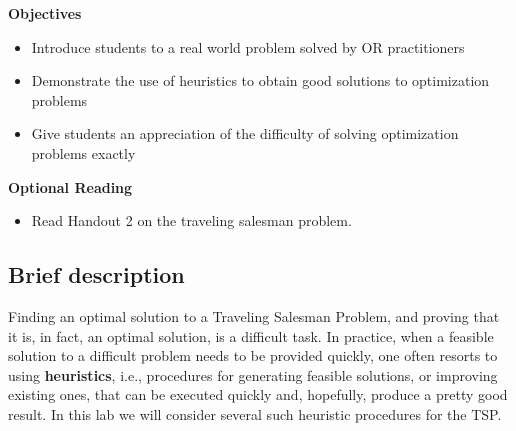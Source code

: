 \documentclass[twoside]{article}%
\begin{document}

\textbf{Objectives}
\begin{itemize}
\item   Introduce students to a real world problem solved by OR practitioners
\item   Demonstrate the use of heuristics to obtain good solutions to optimization
problems
\item  Give students an appreciation of the difficulty of solving
optimization problems exactly
\end{itemize}

\textbf{Optional Reading}
\begin{itemize}
\item
Read Handout 2 on the traveling salesman problem.
\end{itemize}
\vspace{2pt}

\subsection*{Brief description}


Finding an optimal solution to a Traveling Salesman Problem, and proving that it is, in fact, an optimal solution, is a difficult task. In practice, when a feasible solution to a difficult problem needs to be provided quickly, one often resorts to using \textbf{heuristics}, i.e., procedures for generating feasible solutions, or improving existing ones, that can be executed quickly and, hopefully, produce a pretty good result. In this lab we will consider several such heuristic procedures for the TSP.
\end{document}
